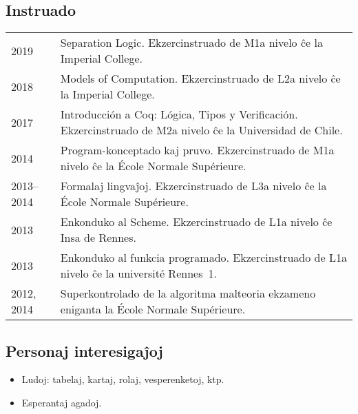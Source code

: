 \documentclass[12pt,a4paper]{article}
\makeatletter
\newcommand{\en}[1]{\foreignlanguage{english}{{#1}}}
\newcommand{\fr}[1]{\foreignlanguage{french}{{#1}}}
\newcommand{\es}[1]{\foreignlanguage{spanish}{{#1}}}
\newcommand{\en}[1]{\foreignlanguage{english}{{#1}}}
\newcommand{\fr}[1]{\foreignlanguage{french}{{#1}}}
\newcommand{\es}[1]{\foreignlanguage{spanish}{{#1}}}
\newenvironment{datecvsection}[1]%
               {\subsection*{#1}%
                 \noindent \begin{tabular}{@{}p{\annee}p{\texte}@{}}}
               {\end{tabular}}
\newenvironment{itemcvsection}[1]%
               {\subsection*{#1}\begin{itemize}}
               {\end{itemize}}
\newcommand\placeName{}
\makeatother
\begin{document}
\begin{datecvsection}{Instruado}

    2019 & Separation Logic. Ekzercinstruado de M1a nivelo ĉe la \en{\placeName{Imperial College}}. \\

    2018 & Models of Computation. Ekzercinstruado de L2a nivelo ĉe la \en{\placeName{Imperial College}}. \\

    2017 & Introducción a Coq: Lógica, Tipos y Verificación. Ekzercinstruado de M2a nivelo ĉe la \es{\placeName{Universidad de Chile}}. \\

    2014 & Program-konceptado kaj pruvo. Ekzercinstruado de M1a nivelo ĉe la \fr{\placeName{École Normale Supérieure}}. \\

    2013–2014 & Formalaj lingvaĵoj. Ekzercinstruado de L3a nivelo ĉe la \fr{\placeName{École Normale Supérieure}}. \\

    2013 & Enkonduko al Scheme. Ekzercinstruado de L1a nivelo ĉe \placeName{Insa} de \placeName{Rennes}. \\

    2013 & Enkonduko al funkcia programado. Ekzercinstruado de L1a nivelo ĉe la \fr{université \placeName{Rennes}~1}. \\

    2012, 2014 & Superkontrolado de la algoritma malteoria ekzameno eniganta la \fr{\placeName{École Normale Supérieure}}.

\end{datecvsection}

\begin{itemcvsection}{Personaj interesigaĵoj}

  \item Ludoj: tabelaj, kartaj, rolaj, vesperenketoj, ktp.
  \item Esperantaj agadoj.

\end{itemcvsection}
\end{document}
